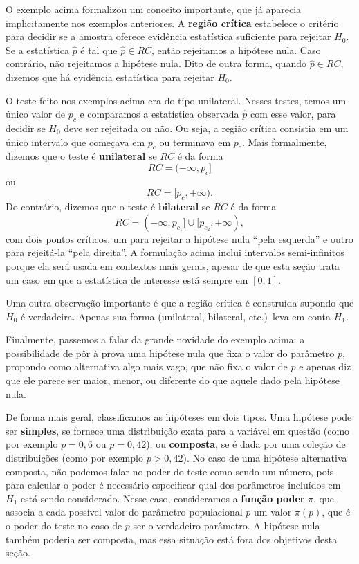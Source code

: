 \documentclass[12pt,a4paper]{article}
\theoremstyle{plain}
\theoremstyle{definition}
\theoremstyle{remark}
\begin{document}
O exemplo acima formalizou um conceito importante, que já aparecia implicitamente nos exemplos anteriores.
A \textbf{região crítica} estabelece o critério para decidir se a amostra oferece evidência estatística suficiente para rejeitar $H_0$.
Se a estatística $\hat{p}$ é tal que $\hat{p} \in RC$, então rejeitamos a hipótese nula. Caso contrário, não rejeitamos a hipótese nula.
Dito de outra forma, quando $\hat{p} \in RC$, dizemos que há evidência estatística para rejeitar $H_0$.

O teste feito nos exemplos acima era do tipo unilateral.
Nesses testes, temos um único valor de $p_c$ e comparamos a estatística observada $\hat{p}$ com esse valor, para decidir se $H_0$ deve ser rejeitada ou não.
Ou seja, a região crítica consistia em um único intervalo que começava em $p_c$ ou terminava em $p_c$.
Mais formalmente, dizemos que o teste é \textbf{unilateral} se $RC$ é da forma $$RC=(-\infty, p_c]$$ ou $$RC=[p_c, +\infty).$$
Do contrário, dizemos que o teste é \textbf{bilateral} se $RC$ é da forma $$RC=(-\infty, p_{c_1}] \cup [p_{c_2}, +\infty),$$
com dois pontos críticos, um para rejeitar a hipótese nula ``pela esquerda'' e outro para rejeitá-la ``pela direita''.
A formulação acima inclui intervalos semi-infinitos porque ela será usada em contextos mais gerais, apesar de que esta seção trata um caso em que a estatística de interesse está sempre em $[0,1]$.

Uma outra observação importante é que a região crítica é construída supondo que $H_0$ é verdadeira.
Apenas sua forma (unilateral, bilateral, etc.)\ leva em conta $H_1$.

Finalmente, passemos a falar da grande novidade do exemplo acima:
a possibilidade de pôr à prova uma hipótese nula que fixa o valor do parâmetro $p$, propondo como alternativa algo mais vago, que não fixa o valor de $p$ e apenas diz que ele parece ser maior, menor, ou diferente do que aquele dado pela hipótese nula.

De forma mais geral, classificamos as hipóteses em dois tipos.
Uma hipótese pode ser \textbf{simples}, se fornece uma distribuição exata para a variável em questão (como por exemplo $p=0,6$ ou $p=0,42$), ou \textbf{composta}, se é dada por uma coleção de distribuições (como por exemplo $p>0,42$).
No caso de uma hipótese alternativa composta, não podemos falar no poder do teste como sendo um número, pois para calcular o poder é necessário especificar qual dos parâmetros incluídos em $H_1$ está sendo considerado.
Nesse caso, consideramos a \textbf{função poder} $\pi$, que associa a cada possível valor do parâmetro populacional $p$ um valor $\pi(p)$, que é o poder do teste no caso de $p$ ser o verdadeiro parâmetro.
A hipótese nula também poderia ser composta, mas essa situação está fora dos objetivos desta seção.
\end{document}
